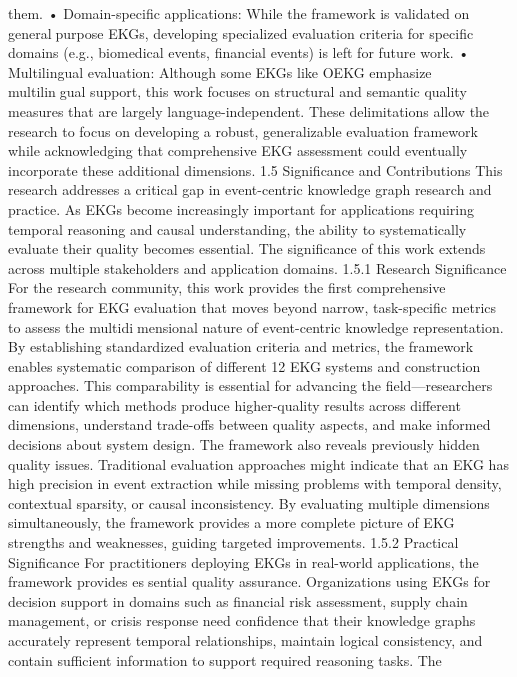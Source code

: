 them.
• Domain-specific applications: While the framework is validated on generalpurpose EKGs, developing specialized evaluation criteria for specific domains (e.g.,
biomedical events, financial events) is left for future work.
• Multilingual evaluation: Although some EKGs like OEKG emphasize multilingual support, this work focuses on structural and semantic quality measures that
are largely language-independent.
These delimitations allow the research to focus on developing a robust, generalizable
evaluation framework while acknowledging that comprehensive EKG assessment could
eventually incorporate these additional dimensions.
1.5 Significance and Contributions
This research addresses a critical gap in event-centric knowledge graph research and
practice. As EKGs become increasingly important for applications requiring temporal
reasoning and causal understanding, the ability to systematically evaluate their quality
becomes essential. The significance of this work extends across multiple stakeholders and
application domains.
1.5.1 Research Significance
For the research community, this work provides the first comprehensive framework for
EKG evaluation that moves beyond narrow, task-specific metrics to assess the multidimensional nature of event-centric knowledge representation. By establishing standardized
evaluation criteria and metrics, the framework enables systematic comparison of different
12
EKG systems and construction approaches. This comparability is essential for advancing
the field—researchers can identify which methods produce higher-quality results across
different dimensions, understand trade-offs between quality aspects, and make informed
decisions about system design.
The framework also reveals previously hidden quality issues. Traditional evaluation
approaches might indicate that an EKG has high precision in event extraction while
missing problems with temporal density, contextual sparsity, or causal inconsistency. By
evaluating multiple dimensions simultaneously, the framework provides a more complete
picture of EKG strengths and weaknesses, guiding targeted improvements.
1.5.2 Practical Significance
For practitioners deploying EKGs in real-world applications, the framework provides essential quality assurance. Organizations using EKGs for decision support in domains such
as financial risk assessment, supply chain management, or crisis response need confidence
that their knowledge graphs accurately represent temporal relationships, maintain logical
consistency, and contain sufficient information to support required reasoning tasks. The
